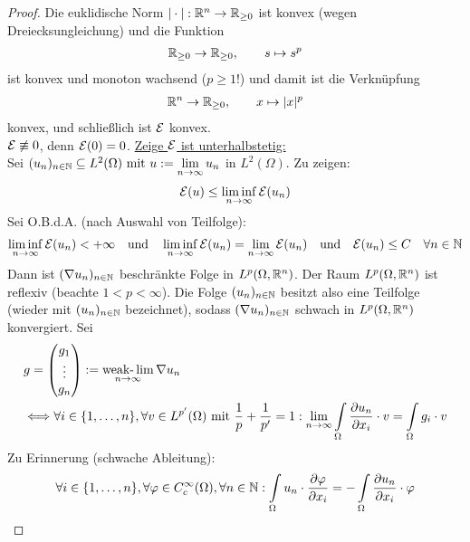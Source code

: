 \begin{beispiel}
	\begin{proof}
		Die euklidische Norm $|\cdot|:\mathbb{R}^n\to\mathbb{R}_{\geq0}$ ist konvex (wegen Dreiecksungleichung) und die Funktion
		\begin{align*}
			\mathbb{R}_{\geq0}\to\mathbb{R}_{\geq0},\qquad s\mapsto s^p
		\end{align*}
		ist konvex und monoton wachsend ($p\geq1$!) und damit ist die Verknüpfung
		\begin{align*}
			\mathbb{R}^n\to\mathbb{R}_{\geq0},\qquad x\mapsto |x|^p
		\end{align*}
		konvex, und schließlich ist $\mathcal{E}$ konvex.\\
		$\mathcal{E}\not\equiv0$, denn $\mathcal{E}(0)=0$.\nl
		\underline{Zeige $\mathcal{E}$ ist unterhalbstetig:}\\
		Sei $(u_n)_{n\in\mathbb{N}}\subseteq L^2(\Omega)\text{ mit } u:=\lim\limits_{n\to\infty} u_n$ in $L^2(\Omega)$. 
		Zu zeigen:
		\begin{align*}
			\mathcal{E}(u)\leq\liminf\limits_{n\to\infty}\mathcal{E}(u_n)
		\end{align*}
		Sei O.B.d.A. (nach Auswahl von Teilfolge):
		\begin{align*}
			\liminf\limits_{n\to\infty}\mathcal{E}(u_n)<+\infty
			\quad\text{und}\quad
			\liminf\limits_{n\to\infty}\mathcal{E}(u_n)=\lim\limits_{n\to\infty}\mathcal{E}(u_n)
			\quad\text{und}\quad
			\mathcal{E}(u_n)\leq C\quad\forall n\in\mathbb{N}
		\end{align*}
		Dann ist $(\nabla u_n)_{n\in\mathbb{N}}$ beschränkte Folge in $L^p(\Omega,\mathbb{R}^n)$. 
		Der Raum $L^p(\Omega,\mathbb{R}^n)$ ist reflexiv (beachte $1<p<\infty$). 
		Die Folge $(u_n)_{n\in\mathbb{N}}$ besitzt also eine Teilfolge (wieder mit $(u_n)_{n\in\mathbb{N}}$ bezeichnet), 
		sodass $(\nabla u_n)_{n\in\mathbb{N}}$ schwach in $L^p(\Omega,\mathbb{R}^n)$ konvergiert. 
		Sei
		\begin{align*}
			&g=\begin{pmatrix}
				g_1\\ \vdots\\ g_n
			\end{pmatrix}:=\operatorname*{\text{weak-}\lim}\limits_{n\to\infty}\nabla u_n\\
			&\Longleftrightarrow\forall i\in\lbrace1,\ldots,n\rbrace,\forall v\in L^{p'}(\Omega)\text{ mit }\frac{1}{p}+\frac{1}{p'}=1:
			\lim\limits_{n\to\infty}\int\limits_\Omega\frac{\partial u_n}{\partial x_i}\cdot v=\int\limits_\Omega g_i\cdot v
		\end{align*}
		Zu Erinnerung (schwache Ableitung):
		\begin{align*}
			\forall i\in\lbrace 1,\ldots,n\rbrace,\forall\varphi\in C_c^\infty(\Omega),\forall n\in\N:
			\int\limits_\Omega u_n\cdot\frac{\partial\varphi}{\partial x_i}=-\int\limits_\Omega\frac{\partial u_n}{\partial x_i}\cdot\varphi

\end{align*}
\end{proof}
\end{beispiel}
